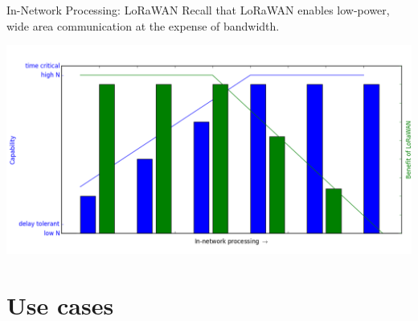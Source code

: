 \documentclass{beamer}
\begin{document}
    \begin{frame}{In-Network Processing: LoRaWAN}
        Recall that LoRaWAN enables low-power, wide area communication at the expense of bandwidth.
        \vfill
        \begin{center}
            \hspace*{-3mm}\includegraphics[scale=0.35]{figures/figure_1.png} \\
        \end{center}
        
    \end{frame}

\section{Use cases}
    
\end{document}
